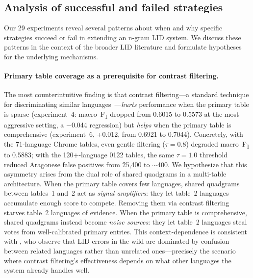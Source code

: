 \documentclass{article}
\newcommand{\fone}{F\textsubscript{1}}
\begin{document}
\subsection{Analysis of successful and failed strategies}
\label{sec:analysis}

Our 29 experiments reveal several patterns about when and why specific strategies succeed or fail in extending an n-gram LID system.
We discuss these patterns in the context of the broader LID literature and formulate hypotheses for the underlying mechanisms.

\paragraph{Primary table coverage as a prerequisite for contrast filtering.}
The most counterintuitive finding is that contrast filtering---a standard technique for discriminating similar languages~\citep{tan-etal-2014-merging, zampieri-etal-2017-findings}---\emph{hurts} performance when the primary table is sparse (experiment~4: macro~\fone{} dropped from 0.6015 to 0.5573 at the most aggressive setting, a $-$0.044 regression) but \emph{helps} when the primary table is comprehensive (experiment~6, +0.012, from 0.6921 to 0.7044).
Concretely, with the 71-language Chrome tables, even gentle filtering ($\tau{=}0.8$) degraded macro~\fone{} to 0.5883; with the 120+-language 0122 tables, the same $\tau{=}1.0$ threshold reduced Aragonese false positives from 25,400 to ${\sim}$400.
We hypothesize that this asymmetry arises from the dual role of shared quadgrams in a multi-table architecture.
When the primary table covers few languages, shared quadgrams between tables~1 and~2 act as \emph{signal amplifiers}: they let table~2 languages accumulate enough score to compete.
Removing them via contrast filtering starves table~2 languages of evidence.
When the primary table is comprehensive, shared quadgrams instead become \emph{noise sources}: they let table~2 languages steal votes from well-calibrated primary entries.
This context-dependence is consistent with \citet{caswell-etal-2020-language}, who observe that LID errors in the wild are dominated by confusion between related languages rather than unrelated ones---precisely the scenario where contrast filtering's effectiveness depends on what other languages the system already handles well.
\end{document}
